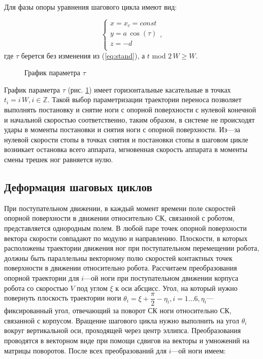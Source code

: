 Для фазы опоры уравнения шагового цикла имеют вид:

\begin{equation}
\left\{
\begin{array}{lcr}
x = x_c = const\\
y = a\,\cos(\tau)\\
z = -d\\
\end{array}
\right.,
\end{equation}
где $\tau$ берется без изменения из (\ref{eq:stand}), а $t$ mod $2\,W \geq W$.
 
 \begin{figure}[t]
 \caption{График параметра $\tau$}
 \label{fig:tau}
 \end{figure}
 
График параметра $\tau$ (рис. \ref{fig:tau}) имеет горизонтальные касательные в точках  $t_i = i\,W, i\in\mathbb{Z}$.
Такой выбор параметризации траектории переноса позволяет выполнять постановку и снятие ноги с опорной поверхности с нулевой конечной и начальной скоростью соответственно, таким образом, в системе не происходят удары в моменты постановки и снятия ноги с опорной поверхности. Из---за нулевой скорости стопы в точках снятия и постановки стопы в шаговом цикле возникает остановка всего аппарата, мгновенная скорость аппарата в моменты смены трешек ног равняется нулю. 

\subsection{Деформация шаговых циклов}
При поступательном движении, в каждый момент времени поле скоростей опорной поверхности в движении относительно СК, связанной с роботом, представляется однородным полем. В любой паре точек опорной поверхности вектора скорости совпадают по модулю и направлению. Плоскости, в которых расположены траектории движения ног при поступательном перемещении робота, должны быть параллельны векторному полю скоростей контактных точек поверхности в движении относительно робота. Рассчитаем преобразования опорной траектории для $i$---ой ноги при поступательном движении корпуса робота со скоростью $V$ под углом $\xi$  к оси абсцисс.
Угол, на который нужно повернуть плоскость траектории ноги $\theta_i = \xi+\dfrac{\pi}{2}-\eta_i,i = 1\ldots6, \eta_i$---фиксированный угол, отвечающий за поворот СК ноги относительно СК, связанной с корпусом. Вращение шагового цикла нужно выполнить на угол $\theta_i$ вокруг вертикальной оси, проходящей через центр эллипса. Преобразования проводятся в векторном виде при помощи сдвигов на векторы и умножений на матрицы поворотов. После всех преобразований для $i$---ой ноги имеем:

